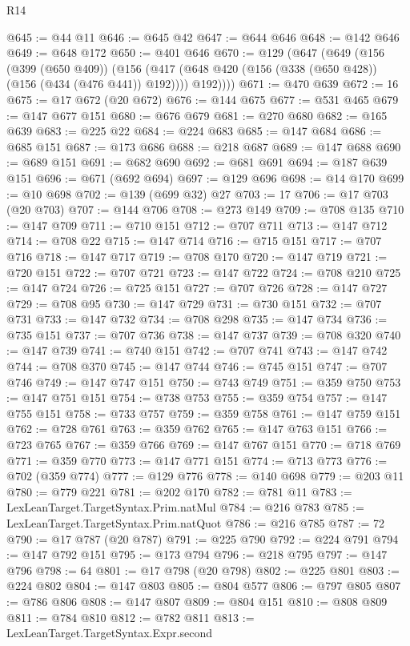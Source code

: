 \begin{lexlean}{R14}
\begin{coremodule}
@645 := @44 @11
@646 := @645 @42
@647 := @644 @646
@648 := @142 @646
@649 := @648 @172
@650 := @401 @646
@670 := @129
    (@647
      (@649
        (@156
          (@399 (@650 @409))
          (@156 (@417 (@648 @420 (@156 (@338 (@650 @428)) (@156 (@434 (@476 @441)) @192)))) @192))))
@671 := @470 @639
@672 := 16
@675 := @17 @672 (@20 @672)
@676 := @144 @675
@677 := @531 @465
@679 := @147 @677 @151
@680 := @676 @679
@681 := @270 @680
@682 := @165 @639
@683 := @225 @22
@684 := @224 @683
@685 := @147 @684
@686 := @685 @151
@687 := @173 @686
@688 := @218 @687
@689 := @147 @688
@690 := @689 @151
@691 := @682 @690
@692 := @681 @691
@694 := @187 @639 @151
@696 := @671 (@692 @694)
@697 := @129 @696
@698 := @14 @170
@699 := @10 @698
@702 := @139 (@699 @32) @27
@703 := 17
@706 := @17 @703 (@20 @703)
@707 := @144 @706
@708 := @273 @149
@709 := @708 @135
@710 := @147 @709
@711 := @710 @151
@712 := @707 @711
@713 := @147 @712
@714 := @708 @22
@715 := @147 @714
@716 := @715 @151
@717 := @707 @716
@718 := @147 @717
@719 := @708 @170
@720 := @147 @719
@721 := @720 @151
@722 := @707 @721
@723 := @147 @722
@724 := @708 @210
@725 := @147 @724
@726 := @725 @151
@727 := @707 @726
@728 := @147 @727
@729 := @708 @95
@730 := @147 @729
@731 := @730 @151
@732 := @707 @731
@733 := @147 @732
@734 := @708 @298
@735 := @147 @734
@736 := @735 @151
@737 := @707 @736
@738 := @147 @737
@739 := @708 @320
@740 := @147 @739
@741 := @740 @151
@742 := @707 @741
@743 := @147 @742
@744 := @708 @370
@745 := @147 @744
@746 := @745 @151
@747 := @707 @746
@749 := @147 @747 @151
@750 := @743 @749
@751 := @359 @750
@753 := @147 @751 @151
@754 := @738 @753
@755 := @359 @754
@757 := @147 @755 @151
@758 := @733 @757
@759 := @359 @758
@761 := @147 @759 @151
@762 := @728 @761
@763 := @359 @762
@765 := @147 @763 @151
@766 := @723 @765
@767 := @359 @766
@769 := @147 @767 @151
@770 := @718 @769
@771 := @359 @770
@773 := @147 @771 @151
@774 := @713 @773
@776 := @702 (@359 @774)
@777 := @129 @776
@778 := @140 @698
@779 := @203 @11
@780 := @779 @221
@781 := @202 @170
@782 := @781 @11
@783 := LexLeanTarget.TargetSyntax.Prim.natMul
@784 := @216 @783
@785 := LexLeanTarget.TargetSyntax.Prim.natQuot
@786 := @216 @785
@787 := 72
@790 := @17 @787 (@20 @787)
@791 := @225 @790
@792 := @224 @791
@794 := @147 @792 @151
@795 := @173 @794
@796 := @218 @795
@797 := @147 @796
@798 := 64
@801 := @17 @798 (@20 @798)
@802 := @225 @801
@803 := @224 @802
@804 := @147 @803
@805 := @804 @577
@806 := @797 @805
@807 := @786 @806
@808 := @147 @807
@809 := @804 @151
@810 := @808 @809
@811 := @784 @810
@812 := @782 @811
@813 := LexLeanTarget.TargetSyntax.Expr.second

\end{coremodule}
\end{lexlean}
